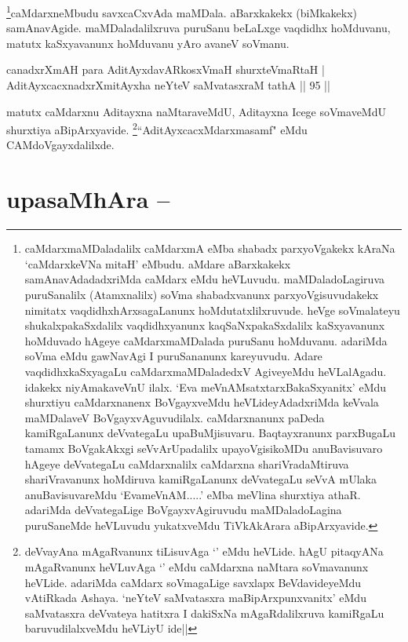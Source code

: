 \begin{artha}
\footnote[3]{caMdarxmaMDaladalilx caMdarxmA eMba shabadx parxyoVgakekx 
kAraNa `caMdarxkeVNa mitaH' eMbudu. aMdare aBarxkakekx 
samAnavAdadadxriMda caMdarx eMdu heVLuvudu. maMDaladoLagiruva 
puruSanalilx (Atamxnalilx) soVma shabadxvanunx parxyoVgisuvudakekx 
nimitatx vaqdidhxhArxsagaLanunx hoMdutatxlilxruvude. heVge soVmalateyu 
shukalxpakaSxdalilx vaqdidhxyanunx kaqSaNxpakaSxdalilx kaSxyavanunx 
hoMduvado hAgeye caMdarxmaMDalada puruSanu hoMduvanu. adariMda soVma 
eMdu gawNavAgi I puruSananunx kareyuvudu. Adare vaqdidhxkaSxyagaLu 
caMdarxmaMDaladedxV AgiveyeMdu heVLalAgadu. idakekx niyAmakaveVnU 
ilalx. `Eva meVnAMsatxtarxBakaSxyanitx' eMdu shurxtiyu caMdarxnanenx 
BoVgayxveMdu heVLideyAdadxriMda keVvala maMDalaveV 
BoVgayxvAguvudilalx. caMdarxnanunx paDeda kamiRgaLanunx deVvategaLu 
upaBuMjisuvaru. Baqtayxranunx parxBugaLu tamamx BoVgakAkxgi 
seVvArUpadalilx upayoVgisikoMDu anuBavisuvaro hAgeye deVvategaLu 
caMdarxnalilx caMdarxna shariVradaMtiruva shariVravanunx hoMdiruva 
kamiRgaLanunx deVvategaLu seVvA mUlaka anuBavisuvareMdu 
`EvameVnAM.....' eMba meVlina shurxtiya athaR. adariMda deVvategaLige 
BoVgayxvAgiruvudu maMDaladoLagina puruSaneMde heVLuvudu yukatxveMdu 
TiVkAkArara aBipArxyavide.}caMdarxneMbudu savxcaCxvAda maMDala. aBarxkakekx 
(biMkakekx) samAnavAgide. maMDaladalilxruva puruSanu beLaLxge vaqdidhx 
hoMduvanu, matutx kaSxyavanunx hoMduvanu yAro avaneV soVmanu.
\end{artha}

\begin{shl}
canadxrXmAH para AditAyxdavARkosxVmaH shurxteVmaRtaH | \\
AditAyxcacxnadxrXmitAyxha neYteV saMvatasxraM tathA \hfill|| 95 || 
\end{shl}

\begin{artha}
matutx caMdarxnu Aditayxna naMtaraveMdU, Aditayxna Icege soVmaveMdU 
shurxtiya aBipArxyavide. \footnote[1]{deVvayAna mAgaRvanunx tiLisuvAga 
`\stext' eMdu heVLide. hAgU pitaqyANa mAgaRvanunx heVLuvAga `\stext' 
eMdu caMdarxna naMtara soVmavanunx heVLide. adariMda caMdarx 
soVmagaLige savxlapx BeVdavideyeMdu vAtiRkada Ashaya. `neYteV 
saMvatasxra maBipArxpunxvanitx' eMdu saMvatasxra deVvateya hatitxra I 
dakiSxNa mAgaRdalilxruva kamiRgaLu baruvudilalxveMdu heVLiyU ide||}``AditAyxcacxMdarxmasamf" eMdu 
CAMdoVgayxdalilxde.
\end{artha}

\section*{upasaMhAra --}

